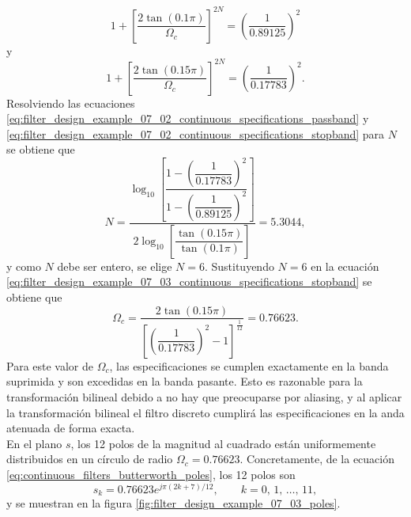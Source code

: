 \documentclass[a4paper]{report}
\begin{document}
\begin{equation}\label{eq:filter_design_example_07_03_continuous_specifications_passband}
 1+\left[\frac{2\tan(0.1\pi)}{\Omega_c}\right]^{2N}=\left(\frac{1}{0.89125}\right)^2 
\end{equation}
y
\begin{equation}\label{eq:filter_design_example_07_03_continuous_specifications_stopband}
 1+\left[\frac{2\tan(0.15\pi)}{\Omega_c}\right]^{2N}=\left(\frac{1}{0.17783}\right)^2. 
\end{equation}
Resolviendo las ecuaciones \ref{eq:filter_design_example_07_02_continuous_specifications_passband} y \ref{eq:filter_design_example_07_02_continuous_specifications_stopband} para \(N\) se obtiene que
\[
 N=\dfrac{\log_{10}\left[\dfrac{1-\left(\dfrac{1}{0.17783}\right)^2}{1-\left(\dfrac{1}{0.89125}\right)^2}\right]}{2\log_{10}\left[\dfrac{\tan(0.15\pi)}{\tan(0.1\pi)}\right]}=5.3044,
\]
y como \(N\) debe ser entero, se elige \(N=6\). Sustituyendo \(N=6\) en la ecuación \ref{eq:filter_design_example_07_03_continuous_specifications_stopband} se obtiene que
\[
 \Omega_c=\dfrac{2\tan(0.15\pi)}{\left[\left(\dfrac{1}{0.17783}\right)^2-1\right]^{\frac{1}{12}}}=0.76623.
\]
Para este valor de \(\Omega_c\), las especificaciones se cumplen exactamente en la banda suprimida y son excedidas en la banda pasante. Esto es razonable para la transformación bilineal debido a no hay que preocuparse por aliasing, y al aplicar la transformación bilineal el filtro discreto cumplirá las especificaciones en la anda atenuada de forma exacta.
\\
En el plano \(s\), los 12 polos de la magnitud al cuadrado están uniformemente distribuidos en un círculo de radio \(\Omega_c=0.76623\). Concretamente, de la ecuación \ref{eq:continuous_filters_butterworth_poles}, los 12 polos son
\[
 s_k=0.76623e^{j\pi(2k+7)/12},
 \qquad 
 k=0,\,1,\,\dots,\,11,
\]
y se muestran en la figura \ref{fig:filter_design_example_07_03_poles}. 
\end{document}
